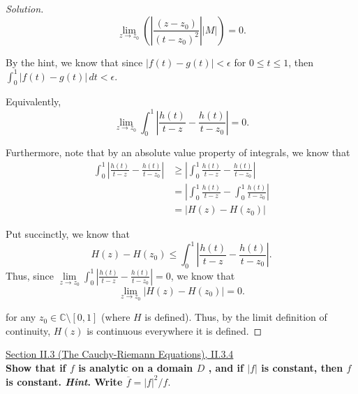 \documentclass[11pt]{article}
\newcommand{\C}{\mathbb{C}}
\newenvironment{solution}
  {\renewcommand\qedsymbol{$\blacksquare$}\begin{proof}[Solution]}
  {\end{proof}}
\theoremstyle{definition}
\begin{document}
\begin{solution}
\[  \lim\limits_{z \rightarrow z_0} \left(\left| \frac{(z-z_0)}{(t-z_0)^2}\right| |M| \right) = 0.\]

By the hint, we know that since $|f(t) - g(t)| < \epsilon$ for $0 \leq t \leq 1$, then $\int_0^1 |f(t) - g(t)| \, dt  < \epsilon.$ 

Equivalently, \[ \lim\limits_{z \rightarrow z_0}\int_0^1 \left| \frac{h(t)}{t-z} - \frac{h(t)}{t-z_0} \right| = 0. \]

Furthermore, note that by an absolute value property of integrals, we know that
\begin{align*}
    \int_0^1 \left| \frac{h(t)}{t-z} - \frac{h(t)}{t-z_0} \right| &\geq \left| \int_0^1 \frac{h(t)}{t-z} - \frac{h(t)}{t-z_0}\right| \\
    &= \left| \int_0^1 \frac{h(t)}{t-z} - \int_0^1 \frac{h(t)}{t-z_0} \right| \\
    &= |H(z) - H(z_0)|
\end{align*}

Put succinctly, we know that \[ H(z) - H(z_0) \leq \int_0^1 \left| \frac{h(t)}{t-z} - \frac{h(t)}{t-z_0} \right|. \]
Thus, since $\lim\limits_{z \rightarrow z_0}\int_0^1 \left| \frac{h(t)}{t-z} - \frac{h(t)}{t-z_0} \right| = 0$, we know that 
\[ \lim\limits_{z \rightarrow z_0} |H(z) - H(z_0)| = 0.\]

for any $z_0 \in \C \setminus [0, 1]$ (where $H$ is defined). Thus, by the limit definition of continuity, $H(z)$ is continuous everywhere it is defined.
\end{solution}

\newpage

\underline{Section II.3 (The Cauchy-Riemann Equations), II.3.4} \\

\textbf{Show that if $f$ is analytic on a domain $D$ , and if $|f|$ is constant, then $f$ is constant. \textit{Hint}. Write $\overline{f} = |f|^2/f.$}
\end{document}
